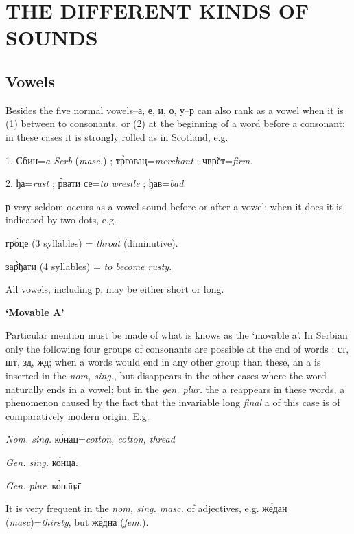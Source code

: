 
\chapter{THE DIFFERENT KINDS OF SOUNDS}
\section{Vowels}

Besides the five normal vowels--а, е, и, о, у--р can also rank as a vowel when
it is (1) between to consonants, or (2) at the beginning of a word before a
consonant; in these cases it is strongly rolled as in Scotland, e.g.

1. Сбин=\emph{a Serb} (\emph{masc.}) ;
т\`{р}говац=\emph{merchant} ; чв\~{р}ст=\emph{firm}.

2. ђа=\emph{rust} ; \`{р}вати се=\emph{to wrestle} ;
ђав=\emph{bad}.

р  very seldom occurs as a vowel-sound before or after a vowel; when it does it
is  indicated by two dots, e.g.

г\"{р}\'{о}це (3 syllables) = \emph{throat} (diminutive).

за\`{\"{р}}ђати (4 syllables) = \emph{to become rusty}.

All vowels, including р, may be either short or long.

\smallskip
{\hfill \large \textbf{`Movable A'} \hfill}

Particular mention must be made of what is knows as the `movable a'. In Serbian
only the following four groups of consonants are possible at the end of words :
ст, шт, зд, жд; when a words would end in any other group than these, an a is
inserted in the \emph{nom, sing.}, but disappears in the other cases where the
word naturally ends in a vowel; but in the \emph{gen. plur.} the a reappears in
these words, a phenomenon caused by the fact that the invariable long
\emph{final} a of this case is of comparatively modern origin.  E.g.

\emph{Nom. sing.} к\`{о}нац=\emph{cotton, cotton, thread}

\emph{Gen. sing.} к\'{о}нца.

\emph{Gen. plur.} к\`{о}н\={а}ц\={а}

It is very frequent in the \emph{nom, sing. masc.} of adjectives, e.g.
ж\'{е}дан (\emph{masc})=\emph{thirsty}, but ж\'{е}дна (\textit{fem.}).

